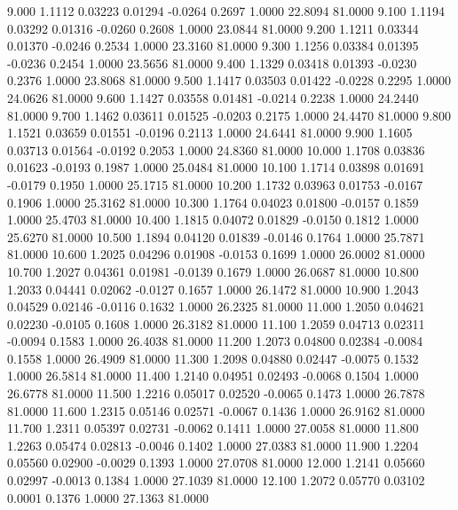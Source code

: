    9.000   1.1112   0.03223   0.01294  -0.0264   0.2697   1.0000  22.8094  81.0000
   9.100   1.1194   0.03292   0.01316  -0.0260   0.2608   1.0000  23.0844  81.0000
   9.200   1.1211   0.03344   0.01370  -0.0246   0.2534   1.0000  23.3160  81.0000
   9.300   1.1256   0.03384   0.01395  -0.0236   0.2454   1.0000  23.5656  81.0000
   9.400   1.1329   0.03418   0.01393  -0.0230   0.2376   1.0000  23.8068  81.0000
   9.500   1.1417   0.03503   0.01422  -0.0228   0.2295   1.0000  24.0626  81.0000
   9.600   1.1427   0.03558   0.01481  -0.0214   0.2238   1.0000  24.2440  81.0000
   9.700   1.1462   0.03611   0.01525  -0.0203   0.2175   1.0000  24.4470  81.0000
   9.800   1.1521   0.03659   0.01551  -0.0196   0.2113   1.0000  24.6441  81.0000
   9.900   1.1605   0.03713   0.01564  -0.0192   0.2053   1.0000  24.8360  81.0000
  10.000   1.1708   0.03836   0.01623  -0.0193   0.1987   1.0000  25.0484  81.0000
  10.100   1.1714   0.03898   0.01691  -0.0179   0.1950   1.0000  25.1715  81.0000
  10.200   1.1732   0.03963   0.01753  -0.0167   0.1906   1.0000  25.3162  81.0000
  10.300   1.1764   0.04023   0.01800  -0.0157   0.1859   1.0000  25.4703  81.0000
  10.400   1.1815   0.04072   0.01829  -0.0150   0.1812   1.0000  25.6270  81.0000
  10.500   1.1894   0.04120   0.01839  -0.0146   0.1764   1.0000  25.7871  81.0000
  10.600   1.2025   0.04296   0.01908  -0.0153   0.1699   1.0000  26.0002  81.0000
  10.700   1.2027   0.04361   0.01981  -0.0139   0.1679   1.0000  26.0687  81.0000
  10.800   1.2033   0.04441   0.02062  -0.0127   0.1657   1.0000  26.1472  81.0000
  10.900   1.2043   0.04529   0.02146  -0.0116   0.1632   1.0000  26.2325  81.0000
  11.000   1.2050   0.04621   0.02230  -0.0105   0.1608   1.0000  26.3182  81.0000
  11.100   1.2059   0.04713   0.02311  -0.0094   0.1583   1.0000  26.4038  81.0000
  11.200   1.2073   0.04800   0.02384  -0.0084   0.1558   1.0000  26.4909  81.0000
  11.300   1.2098   0.04880   0.02447  -0.0075   0.1532   1.0000  26.5814  81.0000
  11.400   1.2140   0.04951   0.02493  -0.0068   0.1504   1.0000  26.6778  81.0000
  11.500   1.2216   0.05017   0.02520  -0.0065   0.1473   1.0000  26.7878  81.0000
  11.600   1.2315   0.05146   0.02571  -0.0067   0.1436   1.0000  26.9162  81.0000
  11.700   1.2311   0.05397   0.02731  -0.0062   0.1411   1.0000  27.0058  81.0000
  11.800   1.2263   0.05474   0.02813  -0.0046   0.1402   1.0000  27.0383  81.0000
  11.900   1.2204   0.05560   0.02900  -0.0029   0.1393   1.0000  27.0708  81.0000
  12.000   1.2141   0.05660   0.02997  -0.0013   0.1384   1.0000  27.1039  81.0000
  12.100   1.2072   0.05770   0.03102   0.0001   0.1376   1.0000  27.1363  81.0000
